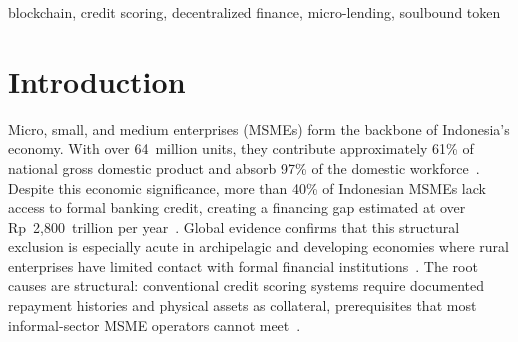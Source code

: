 \documentclass[conference]{IEEEtran}
\begin{document}
\begin{abstract}
Indonesia's 64 million micro, small, and medium enterprises (MSMEs) contribute
61\% of national GDP yet face a credit gap exceeding Rp~2,800~trillion annually.
This gap persists because conventional lenders require documented repayment
histories and physical collateral that most MSME operators cannot provide.
Existing decentralized finance (DeFi) platforms fail this population equally,
as they impose overcollateralization requirements in crypto assets that remain
inaccessible to unbanked borrowers.

We present ModalIn, an Ethereum-based peer-to-peer micro-lending decentralized
application (DApp) that replaces physical collateral with a triple-layer
on-chain reputation system. ModalIn issues each borrower a non-transferable
Soulbound Token (SBT) as a persistent credit identity, organizes borrowers
into tiered Credit Guilds formalizing Indonesia's collective accountability
culture, and enables ETH-staked peer vouching as social guarantee.
A composite reputation score weighted 70\% payment history and 30\% peer
vouch drives an algorithmic annual percentage rate (APR) model bounded
between 6\% and 36\% in alignment with Indonesian Financial Services Authority
(OJK) reference bounds. Validated by 29 passing automated test scenarios
across six Solidity smart contracts, the system demonstrates up to a 65\%
reduction in borrowing cost for high-reputation borrowers compared to unscored
entrants, and a minimum threefold improvement over typical informal moneylender
rates.
\end{abstract}

\begin{IEEEkeywords}
blockchain, credit scoring, decentralized finance, micro-lending, soulbound token
\end{IEEEkeywords}

\section{Introduction}

Micro, small, and medium enterprises (MSMEs) form the backbone of Indonesia's
economy. With over 64~million units, they contribute approximately 61\% of
national gross domestic product and absorb 97\% of the domestic
workforce~\cite{b4}. Despite this economic significance, more than 40\% of
Indonesian MSMEs lack access to formal banking credit, creating a financing gap
estimated at over Rp~2,800~trillion per year~\cite{b4,b15}. Global evidence
confirms that this structural exclusion is especially acute in archipelagic
and developing economies where rural enterprises have limited contact with
formal financial institutions~\cite{b16,b17}. The root causes are structural:
conventional credit scoring systems require documented repayment histories and
physical assets as collateral, prerequisites that most informal-sector MSME
operators cannot meet~\cite{b3}.
\end{document}
